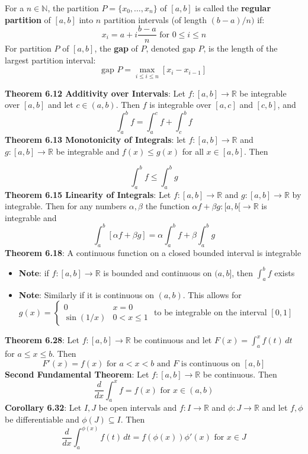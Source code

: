 \documentclass{article}
\begin{document}
  For a $n \in \mathbb{N}$, the partition $P = \{x_0, \ldots, x_n\}$ of $[a, b]$ is called the \textbf{regular partition} of $[a,b]$ into $n$ partition intervals (of length $(b-a)/n)$ if:
  \[x_i = a + i\frac{b - a}{n} \text { for } 0 \leq i \leq n\]
  For partition $P$ of $[a,b]$, the \textbf{gap} of $P$, denoted $\text{gap }P$, is the length of the largest partition interval:
  \[\text{gap }P = \max_{i \leq i \leq n}[x_i - x_{i-1}]\] \bigskip

    \textbf{Theorem 6.12 Additivity over Intervals}: Let $f \colon [a, b] \rightarrow \mathbb{R}$ be integrable over $[a, b]$ and let $c \in (a, b)$. Then $f$ is integrable over $[a,c]$ and $[c, b]$, and
    \[\int_a^b f = \int_a^c f+ \int_c^b f\]
    \textbf{Theorem 6.13 Monotonicity of Integrals}: let $f \colon [a, b] \rightarrow \mathbb{R}$ and $g \colon [a, b] \rightarrow \mathbb{R}$ be integrable and $f(x) \leq g(x)$ for all $x \in [a,b]$. Then

    \[\int_a^b f \leq \int_a^b g\]
    \textbf{Theorem 6.15 Linearity of Integrals}: Let $f\colon [a, b] \rightarrow \mathbb{R}$ and $g \colon [a,b] \rightarrow \mathbb{R}$ by integrable. Then for any numbers $\alpha, \beta$ the function $\alpha f + \beta g \colon [a, b[ \rightarrow \mathbb{R}$ is integrable and
    \[\int_a^b[\alpha f + \beta g] = \alpha \int_a^b f + \beta \int_a^b g\] \bigskip
    \textbf{Theorem 6.18}: A continuous function on a closed bounded interval is integrable
    \begin{itemize}
      \item \textbf{Note}: if $f \colon [a,b] \rightarrow \mathbb{R}$ is bounded and continuous on $(a, b]$, then $\int_a^b f$ exists
      \item \textbf{Note}: Similarly if it is continuous on $(a,b)$. This allows for $g (x) = 
        \begin{cases}
          0 & x = 0\\
          \sin(1/x) & 0 < x \leq 1
        \end{cases}
        $ to be integrable on the interval $[0,1]$ \bigskip
    \end{itemize}
  \textbf{Theorem 6.28}: Let $f \colon [a,b] \rightarrow \mathbb{R}$ be continuous and let $F(x) = \int_a^x f(t) \, dt$ for $a \leq x \leq b$. Then
  \[F'(x) = f(x) \text{ for } a < x < b \text{ and } F \text{ is continuous on } [a,b]\]
  \textbf{Second Fundamental Theorem}: Let $f \colon [a,b] \rightarrow \mathbb{R}$ be continuous. Then
    \[\frac{d}{dx} \int_a^x f = f(x) \text{ for } x \in (a,b)\]
    \textbf{Corollary 6.32}: Let $I, J$ be open intervals and $f \colon I \rightarrow \mathbb{R}$ and $\phi \colon J \rightarrow \mathbb{R}$ and let $f, \phi$ be differentiable and $\phi(J) \subseteq I$. Then
    \[\frac{d}{dx} \int_a^{\phi(x)} f(t) \, dt = f(\phi(x))\phi'(x) \text{ for } x \in J\]
\end{document}
